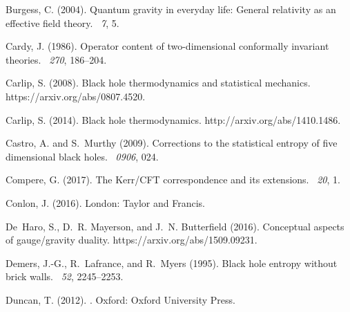 \documentclass[12pt]{article}
\begin{document}
\begin{thebibliography}{}
Burgess, C. (2004).
\newblock Quantum gravity in everyday life: General relativity as an effective
  field theory.
~{\em 7}, 5.

Cardy, J. (1986).
\newblock Operator content of two-dimensional conformally invariant theories.
~{\em 270}, 186--204.

Carlip, S. (2008).
\newblock Black hole thermodynamics and statistical mechanics.
\newblock https://arxiv.org/abs/0807.4520.

Carlip, S. (2014).
\newblock Black hole thermodynamics.
\newblock http://arxiv.org/abs/1410.1486.

Castro, A. and S.~Murthy (2009).
\newblock Corrections to the statistical entropy of five dimensional black
  holes.
~{\em 0906}, 024.

Compere, G. (2017).
\newblock The {K}err/{CFT} correspondence and its extensions.
~{\em 20}, 1.

Conlon, J. (2016).
\newblock London: Taylor and Francis.

De~Haro, S., D.~R. Mayerson, and J.~N. Butterfield (2016).
\newblock Conceptual aspects of gauge/gravity duality.
\newblock https://arxiv.org/abs/1509.09231.

Demers, J.-G., R.~Lafrance, and R.~Myers (1995).
\newblock Black hole entropy without brick walls.
~{\em 52}, 2245--2253.

Duncan, T. (2012).
.
\newblock Oxford: Oxford University Press.


\end{thebibliography}
\end{document}
